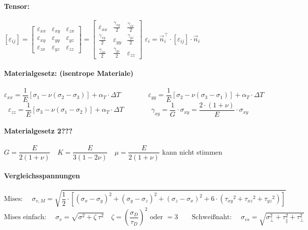 \paragraph{ Tensor:}
	$ 
	\left[\varepsilon_{ij}\right]
	=
	\left[\begin{matrix}
		\varepsilon_{xx} & \varepsilon_{xy} & \varepsilon_{zx} \\
		\varepsilon_{xy} & \varepsilon_{yy} & \varepsilon_{yz} \\
		\varepsilon_{zx} & \varepsilon_{yz} & \varepsilon_{zz}
	\end{matrix}\right]
	=
	\left[\begin{matrix}
		\varepsilon_{xx}      & \frac{\gamma_{xy}}{2} & \frac{\gamma_{zx}}{2} \\
		\frac{\gamma_{xy}}{2} & \varepsilon_{yy}      & \frac{\gamma_{yz}}{2} \\
		\frac{\gamma_{zx}}{2} & \frac{\gamma_{yz}}{2} & \varepsilon_{zz}
	\end{matrix}\right]
	$
	\hfil
	$ \varepsilon_i = \vec{n}_i^\top \cdot [\varepsilon_{ij}] \cdot \vec{n}_i $
	\hfil
	
\paragraph{ Materialgesetz: (isentrope Materiale)}
	\[ 
		\varepsilon_{xx} = \dfrac{1}{E} \left[\sigma_1 - \nu (\sigma_2 - \sigma_3)\right] + \alpha_T \cdot \Delta T
		\qquad\qquad
		\varepsilon_{yy} = \dfrac{1}{E} \left[\sigma_2 - \nu (\sigma_3 - \sigma_1)\right] + \alpha_T \cdot \Delta T
	\]
	\[
		\varepsilon_{zz} = \dfrac{1}{E} \left[\sigma_3 - \nu (\sigma_1 - \sigma_2)\right] + \alpha_T \cdot \Delta T
		\qquad\qquad
		\gamma_{xy} = \dfrac{1}{G} \cdot \sigma_{xy} = \dfrac{2 \cdot (1 + \nu)}{E} \cdot \sigma_{xy}
	\]
	
\paragraph{ Materialgesetz 2???}
	$       G = \dfrac{E}{2(1+ \nu)} 
	\quad   K = \dfrac{E}{3(1-2\nu)} 
	\quad \mu = \dfrac{E}{2(1+ \nu)}   $ kann nicht stimmen
	
	
\paragraph{ Vergleichsspannungen}
	\[ 
		\text{Mises: } \quad 
		\sigma_{v,M} = \sqrt{\dfrac{1}{2} \cdot \left[\left(\sigma_x-\sigma_y\right)^2+\left(\sigma_y-\sigma_z\right)^2+\left(\sigma_z-\sigma_x\right)^2+6\cdot\left({\tau_{xy}}^2+{\tau_{xz}}^2+{\tau_{yz}}^2\right)\right]}
	\]
	\[ 
	\text{Mises einfach: } \quad \sigma_v = \sqrt{\sigma^2 + \zeta\ \tau^2} \quad \zeta = \left(\dfrac{\sigma_D}{\tau_D}\right)^2 \text{ oder } = 3
	\qquad
	\text{Schweißnaht: }\quad \sigma_{vs} = \sqrt{\sigma_\perp^2 + \tau_\parallel^2 + \tau_\perp^2}
	\]

